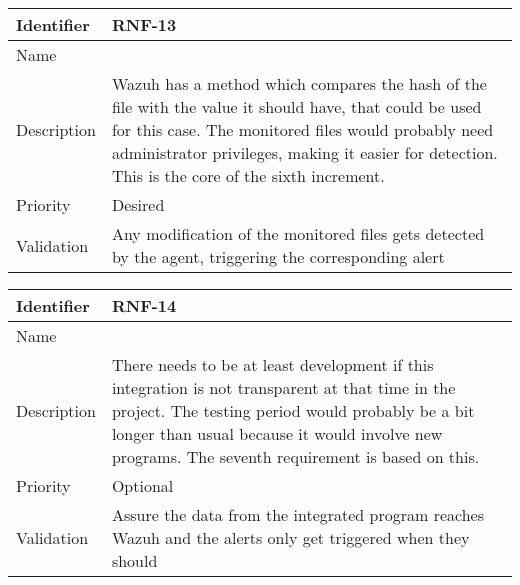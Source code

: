 \begin{table}[H]
	\begin{tabularx}{\textwidth}{|l|X|}
		\hline
		\rowcolor{gray!30}
		Identifier & \textbf{RNF-13} \\ \hline
		Name & \RNFtrece \\ \hline
		Description & Wazuh has a method which compares the hash of the file with the value it should have, that could be used for this case. The monitored files would probably need administrator privileges, making it easier for detection. This is the core of the sixth increment.  \\ \hline
		Priority & Desired \\ \hline
		Validation & Any modification of the monitored files gets detected by the agent, triggering the corresponding alert \\ \hline
	\end{tabularx}
\end{table}
\begin{table}[H]
	\begin{tabularx}{\textwidth}{|l|X|}
		\hline
		\rowcolor{gray!30}
		Identifier & \textbf{RNF-14} \\ \hline
		Name & \RNFcatorce \\ \hline
		Description & There needs to be at least development if this integration is not transparent at that time in the project. The testing period would probably be a bit longer than usual because it would involve new programs. The seventh requirement is based on this. \\ \hline
		Priority & Optional \\ \hline
		Validation & Assure the data from the integrated program reaches Wazuh and the alerts only get triggered when they should \\ \hline
	\end{tabularx}
\end{table}
